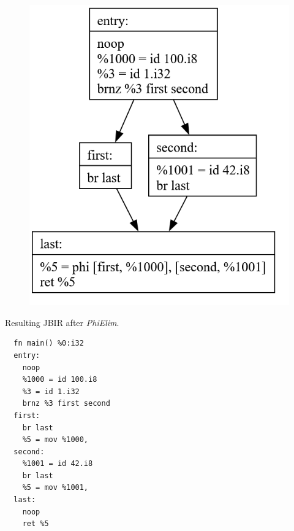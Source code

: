\documentclass[11pt, a4paper, titlepage]{article}
\begin{document}
\begin{figure}[H]
  \centering
  \includegraphics[scale=0.3]{images/i5.png}
\end{figure}

Resulting JBIR after \textit{PhiElim}.
\begin{lstlisting}
  fn main() %0:i32
  entry:
    noop
    %1000 = id 100.i8
    %3 = id 1.i32
    brnz %3 first second
  first:
    br last
    %5 = mov %1000,
  second:
    %1001 = id 42.i8
    br last
    %5 = mov %1001,
  last:
    noop
    ret %5
\end{lstlisting}
\end{document}
